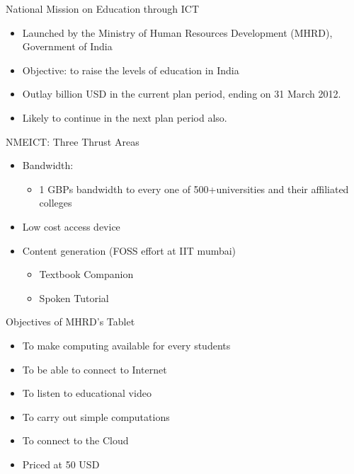 \documentclass{beamer}
\begin{document}
     \begin{frame}{National Mission on Education through ICT}

            \begin{itemize}[<+->]

                   \item Launched by the Ministry of Human Resources Development (MHRD), Government of India
                   \item Objective: to raise the levels of education in India
                   \item Outlay billion USD in the current plan period, ending on 31 March 2012.
                   \item Likely to continue in the next plan period also.

            \end{itemize}
     \end{frame}         
   \begin {frame} {NMEICT: Three Thrust Areas}

       \begin{itemize}
          \item Bandwidth:
                \begin{itemize}
                          \item 1 GBPs bandwidth to every one of 500+universities and their affiliated colleges

                 \end{itemize}
          \item Low cost access device
          \item Content generation (FOSS effort at IIT mumbai)
                    \begin{itemize}
                    \item Textbook Companion
                    \item Spoken Tutorial
                     \end{itemize}
       \end{itemize}
   \end{frame}

  \begin{frame}{Objectives of MHRD’s Tablet}

      \begin{itemize}[<+->]

        \item To make computing available for every students
        \item To be able to connect to Internet
        \item To listen to educational video
        \item To carry out simple computations
        \item To connect to the Cloud
        \item Priced at 50 USD
      \end{itemize}

  \end{frame}
\end{document}
